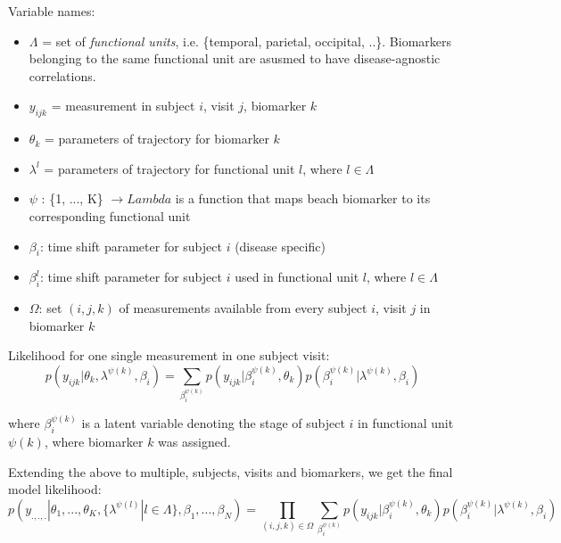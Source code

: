 \documentclass[11pt,a4paper]{article}
\begin{document}
Variable names:
\begin{itemize}
 \item $\Lambda$ = set of \emph{functional units}, i.e. \{temporal, parietal, occipital, ..\}. Biomarkers belonging to the same functional unit are asusmed to have disease-agnostic correlations.
 \item $y_{ijk}$ = measurement in subject $i$, visit $j$, biomarker $k$
 \item $\theta_k$ = parameters of trajectory for biomarker $k$
 \item $\lambda^l$ = parameters of trajectory for functional unit $l$, where $l \in \Lambda$
 \item $\psi$ : \{1, ..., K\} $ \rightarrow Lambda$ is a function that maps beach biomarker to its corresponding functional unit
 \item $\beta_i$: time shift parameter for subject $i$ (disease specific)
 \item $\beta_i^{l}$: time shift parameter for subject $i$ used in functional unit $l$, where $l \in \Lambda$
 \item $\Omega$: set ${(i,j,k)}$ of measurements available from every subject $i$, visit $j$ in biomarker $k$
\end{itemize}

Likelihood for one single measurement in one subject visit: 
\begin{equation}
 p(y_{ijk}|\theta_k, \lambda^{\psi(k)}, \beta_i) = \sum_{\beta_i^{\psi(k)}} p(y_{ijk}| \beta_i^{\psi(k)}, \theta_k) p(\beta_i^{\psi(k)}| \lambda^{\psi(k)}, \beta_i)
\end{equation}

where $\beta_i^{\psi(k)}$ is a latent variable denoting the stage of subject $i$ in functional unit $\psi(k)$, where biomarker $k$ was assigned.

Extending the above to multiple, subjects, visits and biomarkers, we get the final model likelihood:
\begin{equation}
 p(y_{.,.,.}|\theta_1, ..., \theta_K, \{\lambda^{\psi(l)} | l \in \Lambda \}, \beta_1, ..., \beta_N) = \prod_{(i,j,k) \in \Omega} \sum_{\beta_i^{\psi(k)}} p(y_{ijk}| \beta_i^{\psi(k)}, \theta_k) p(\beta_i^{\psi(k)}| \lambda^{\psi(k)}, \beta_i)
\end{equation}
\end{document}
